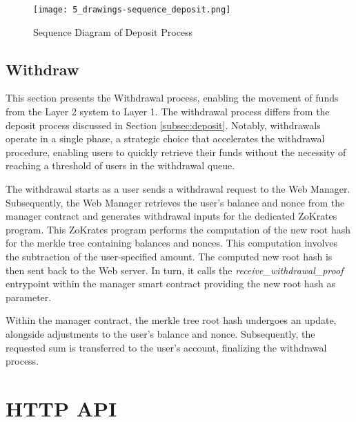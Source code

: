 \begin{figure}[ht]
	\centering
	\texttt{[image: 5\_drawings-sequence\_deposit.png]}
	\caption[Sequence Deposit]{Sequence Diagram of Deposit Process}
	\label{fig:6_drawings-sequence_deposit.png}
\end{figure}

\subsection{Withdraw}
This section presents the Withdrawal process, enabling the movement of funds from the Layer 2 system to Layer 1. The withdrawal process differs from the deposit process discussed  in Section \ref{subsec:deposit}. Notably, withdrawals operate in a single phase, a strategic choice that accelerates the withdrawal procedure, enabling users to quickly retrieve their funds without the necessity of reaching a threshold of users in the withdrawal queue.

The withdrawal starts as a user sends a withdrawal request to the Web Manager. Subsequently, the Web Manager retrieves the user's balance and nonce from the manager contract and generates withdrawal inputs for the dedicated ZoKrates program. This ZoKrates program performs the computation of the new root hash for the merkle tree containing balances and nonces. This computation involves the subtraction of the user-specified amount. The computed new root hash is then sent back to the Web server. In turn, it calls the \textit{receive\_withdrawal\_proof} entrypoint within the manager smart contract providing the new root hash as parameter.

Within the manager contract, the merkle tree root hash undergoes an update, alongside adjustments to the user's balance and nonce. Subsequently, the requested sum is transferred to the user's account, finalizing the withdrawal process.

\section{HTTP API}

